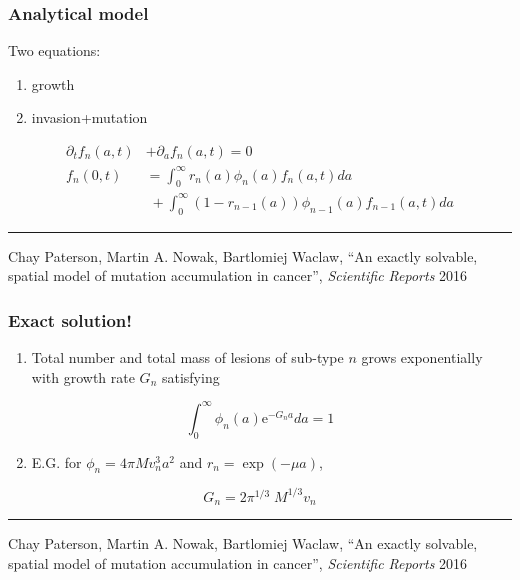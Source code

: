 \documentclass{beamer}
\begin{document}
\begin{frame}
\frametitle{Analytical model}

Two equations:
\begin{enumerate}
    \item growth
    \item invasion+mutation
\end{enumerate}
\begin{align}
    \partial_t f_n(a,t) &+ \partial_a f_n(a,t) = 0\\
    f_n(0,t) &= \int_0^\infty r_n(a)\phi_n(a)f_n(a,t) da \nonumber \\
    &\; + \int_0^\infty
    (1-r_{n-1}(a))\phi_{n-1}(a) f_{n-1}(a,t) da
\end{align}

\;
\hrule
\;

\begin{center}
\tiny{Chay Paterson, Martin A. Nowak, Bartlomiej Waclaw, ``An exactly
solvable, spatial model of mutation accumulation in cancer'', \emph{Scientific
Reports} 2016}
\end{center}
\end{frame}

\begin{frame}
\frametitle{Exact solution!}
    \begin{enumerate}
        \item Total number and total mass of lesions of sub-type $n$ grows
        exponentially with growth rate $G_n$ satisfying
    \end{enumerate}

    \begin{equation*}
        \int_0^\infty \phi_n(a) \mathrm{e}^{-G_n a} da = 1
    \end{equation*}

    \begin{enumerate}
        \setcounter{enumi}{1}
        \item E.G. for $\phi_n = 4\pi M v_n^3 a^2$ and $r_n = \exp(-\mu a)$,
    \end{enumerate}

    \begin{equation*}
        G_n = 2 \pi^{1/3}\; M^{1/3} v_n
    \end{equation*}
\;
\hrule
\;

    \begin{center}
    \small{Chay Paterson, Martin A. Nowak, Bartlomiej Waclaw, ``An exactly
    solvable, spatial model of mutation accumulation in cancer'', \emph{Scientific
    Reports} 2016}
    \end{center}

\end{frame}
\end{document}
